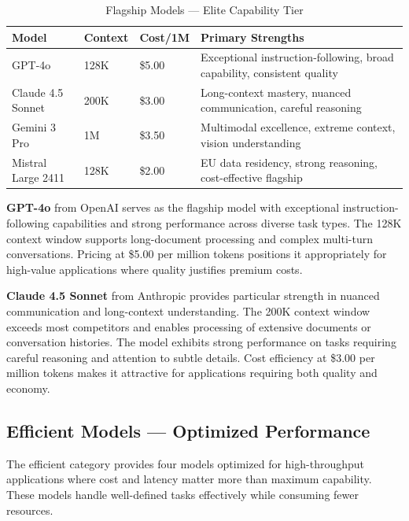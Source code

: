 \documentclass[12pt,a4paper,twoside]{report}
\begin{document}
\begin{table}[h]
\centering
\small
\begin{tabular}{@{}p{2.8cm}p{1.5cm}p{1.5cm}p{5.5cm}@{}}
\toprule
\textbf{Model} & \textbf{Context} & \textbf{Cost/1M} & \textbf{Primary Strengths} \\
\midrule
GPT-4o & 128K & \$5.00 & Exceptional instruction-following, broad capability, consistent quality \\
Claude 4.5 Sonnet & 200K & \$3.00 & Long-context mastery, nuanced communication, careful reasoning \\
Gemini 3 Pro & 1M & \$3.50 & Multimodal excellence, extreme context, vision understanding \\
Mistral Large 2411 & 128K & \$2.00 & EU data residency, strong reasoning, cost-effective flagship \\
\bottomrule
\end{tabular}
\caption{Flagship Models — Elite Capability Tier}
\label{tab:flagship-models}
\end{table}

\textbf{GPT-4o} from OpenAI serves as the flagship model with exceptional instruction-following capabilities and strong performance across diverse task types. The 128K context window supports long-document processing and complex multi-turn conversations. Pricing at \$5.00 per million tokens positions it appropriately for high-value applications where quality justifies premium costs.

\textbf{Claude 4.5 Sonnet} from Anthropic provides particular strength in nuanced communication and long-context understanding. The 200K context window exceeds most competitors and enables processing of extensive documents or conversation histories. The model exhibits strong performance on tasks requiring careful reasoning and attention to subtle details. Cost efficiency at \$3.00 per million tokens makes it attractive for applications requiring both quality and economy.

\subsection{Efficient Models — Optimized Performance}

The efficient category provides four models optimized for high-throughput applications where cost and latency matter more than maximum capability. These models handle well-defined tasks effectively while consuming fewer resources.
\end{document}
